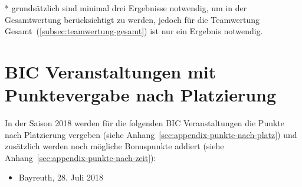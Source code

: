 * grundsätzlich sind minimal drei Ergebnisse notwendig, um in der Gesamtwertung berücksichtigt zu werden, jedoch für die Teamwertung Gesamt~(\ref{subsec:teamwertung-gesamt}) ist nur ein Ergebnis notwendig.

\section{BIC Veranstaltungen mit Punktevergabe nach Platzierung}
\label{sec:appendix-veranstaltungen-nach-platzierung}
In der Saison 2018 werden für die folgenden BIC Veranstaltungen die Punkte nach Platzierung vergeben (siehe Anhang~\ref{sec:appendix-punkte-nach-platz}) und zusätzlich werden noch mögliche Bonuspunkte addiert (siehe Anhang~\ref{sec:appendix-punkte-nach-zeit}):

\begin{itemize}
	\item Bayreuth, 28. Juli 2018
\end{itemize}
